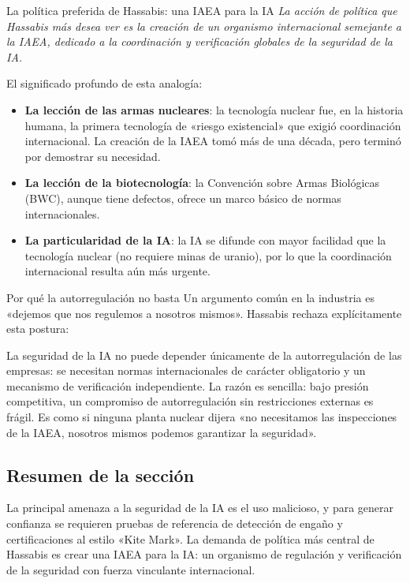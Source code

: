 \documentclass[a4paper]{article}
\begin{document}
\begin{importantbox}{La política preferida de Hassabis: una IAEA para la IA}
\textit{La acción de política que Hassabis más desea ver es la creación de un organismo internacional semejante a la IAEA, dedicado a la coordinación y verificación globales de la seguridad de la IA.}

El significado profundo de esta analogía:
\begin{itemize}
    \item \textbf{La lección de las armas nucleares}: la tecnología nuclear fue, en la historia humana, la primera tecnología de «riesgo existencial» que exigió coordinación internacional. La creación de la IAEA tomó más de una década, pero terminó por demostrar su necesidad.
    \item \textbf{La lección de la biotecnología}: la Convención sobre Armas Biológicas (BWC), aunque tiene defectos, ofrece un marco básico de normas internacionales.
    \item \textbf{La particularidad de la IA}: la IA se difunde con mayor facilidad que la tecnología nuclear (no requiere minas de uranio), por lo que la coordinación internacional resulta aún más urgente.
\end{itemize}
\end{importantbox}

\begin{warningbox}{Por qué la autorregulación no basta}
Un argumento común en la industria es «dejemos que nos regulemos a nosotros mismos». Hassabis rechaza explícitamente esta postura:

La seguridad de la IA no puede depender únicamente de la autorregulación de las empresas: se necesitan normas internacionales de carácter obligatorio y un mecanismo de verificación independiente. La razón es sencilla: bajo presión competitiva, un compromiso de autorregulación sin restricciones externas es frágil. Es como si ninguna planta nuclear dijera «no necesitamos las inspecciones de la IAEA, nosotros mismos podemos garantizar la seguridad».
\end{warningbox}

\subsection{Resumen de la sección}

La principal amenaza a la seguridad de la IA es el uso malicioso, y para generar confianza se requieren pruebas de referencia de detección de engaño y certificaciones al estilo «Kite Mark». La demanda de política más central de Hassabis es crear una IAEA para la IA: un organismo de regulación y verificación de la seguridad con fuerza vinculante internacional.
\end{document}
